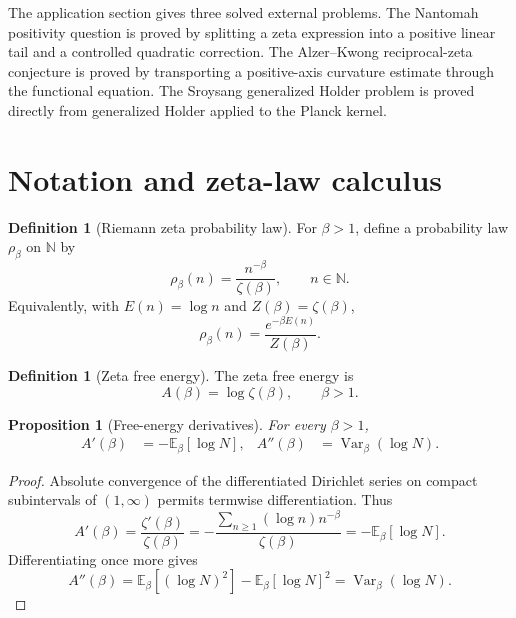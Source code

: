 \documentclass[11pt]{article}
\numberwithin{equation}{section}
\newtheorem{proposition}[theorem]{Proposition}
\theoremstyle{definition}
\newtheorem{definition}[theorem]{Definition}
\theoremstyle{remark}
\DeclareMathOperator{\Var}{Var}
\newcommand{\E}{\mathbb E}
\newcommand{\N}{\mathbb N}
\newcommand{\1}{\mathbf 1}
\begin{document}
The application section gives three solved external problems.  The Nantomah positivity question is proved by splitting a zeta expression into a positive linear tail and a controlled quadratic correction.  The Alzer--Kwong reciprocal-zeta conjecture is proved by transporting a positive-axis curvature estimate through the functional equation.  The Sroysang generalized Holder problem is proved directly from generalized Holder applied to the Planck kernel.

\section{Notation and zeta-law calculus}

\begin{definition}[Riemann zeta probability law]
\label{def:zeta-law}
For \(\beta>1\), define a probability law \(\rho_\beta\) on \(\N\) by
\begin{equation}
\label{eq:zeta-law}
\rho_\beta(n)=\frac{n^{-\beta}}{\zeta(\beta)},\qquad n\in\N.
\end{equation}
Equivalently, with \(E(n)=\log n\) and \(Z(\beta)=\zeta(\beta)\),
\begin{equation}
\label{eq:gibbs-form}
\rho_\beta(n)=\frac{e^{-\beta E(n)}}{Z(\beta)}.
\end{equation}
\end{definition}

\begin{definition}[Zeta free energy]
\label{def:zeta-free-energy}
The zeta free energy is
\begin{equation}
\label{eq:zeta-free-energy}
A(\beta)=\log\zeta(\beta),\qquad \beta>1.
\end{equation}
\end{definition}

\begin{proposition}[Free-energy derivatives]
\label{prop:free-energy-derivatives}
For every \(\beta>1\),
\begin{align}
\label{eq:free-energy-derivatives}
A'(\beta)&=-\E_\beta[\log N],&
A''(\beta)&=\Var_\beta(\log N).
\end{align}
\end{proposition}

\begin{proof}
Absolute convergence of the differentiated Dirichlet series on compact subintervals of \((1,\infty)\) permits termwise differentiation.  Thus
\begin{equation}
\label{eq:first-free-derivative-proof}
A'(\beta)=\frac{\zeta'(\beta)}{\zeta(\beta)}
=-\frac{\sum_{n\ge1}(\log n)n^{-\beta}}{\zeta(\beta)}
=-\E_\beta[\log N].
\end{equation}
Differentiating once more gives
\begin{equation}
\label{eq:second-free-derivative-proof}
A''(\beta)=\E_\beta[(\log N)^2]-\E_\beta[\log N]^2
=\Var_\beta(\log N).
\end{equation}
\end{proof}
\end{document}
